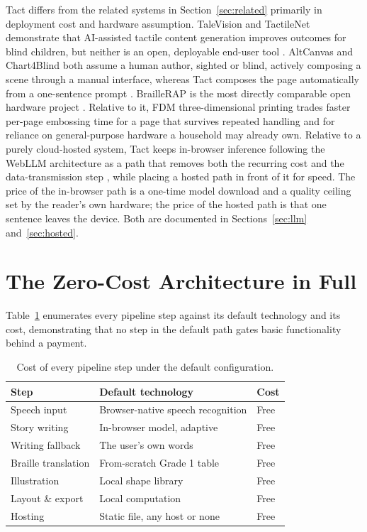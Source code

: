 \documentclass[conference]{IEEEtran}
\begin{document}
Tact differs from the related systems in Section~\ref{sec:related} primarily in deployment cost and hardware assumption. TaleVision and TactileNet demonstrate that AI-assisted tactile content generation improves outcomes for blind children, but neither is an open, deployable end-user tool \cite{talevision,tactilenet}. AltCanvas and Chart4Blind both assume a human author, sighted or blind, actively composing a scene through a manual interface, whereas Tact composes the page automatically from a one-sentence prompt \cite{altcanvas,chart4blind}. BrailleRAP is the most directly comparable open hardware project \cite{braillerap}. Relative to it, FDM three-dimensional printing trades faster per-page embossing time for a page that survives repeated handling and for reliance on general-purpose hardware a household may already own. Relative to a purely cloud-hosted system, Tact keeps in-browser inference following the WebLLM architecture as a path that removes both the recurring cost and the data-transmission step \cite{webllm}, while placing a hosted path in front of it for speed. The price of the in-browser path is a one-time model download and a quality ceiling set by the reader's own hardware; the price of the hosted path is that one sentence leaves the device. Both are documented in Sections~\ref{sec:llm} and~\ref{sec:hosted}.

\section{The Zero-Cost Architecture in Full}\label{sec:zerocost}

Table~\ref{tab:zerocost} enumerates every pipeline step against its default technology and its cost, demonstrating that no step in the default path gates basic functionality behind a payment.

\begin{table}[t]
\caption{Cost of every pipeline step under the default configuration.}
\label{tab:zerocost}
\centering
\begin{tabular}{p{2.3cm}p{2.9cm}p{0.9cm}}
\toprule
Step & Default technology & Cost \\
\midrule
Speech input & Browser-native speech recognition & Free \\
Story writing & In-browser model, adaptive & Free \\
Writing fallback & The user's own words & Free \\
Braille translation & From-scratch Grade 1 table & Free \\
Illustration & Local shape library & Free \\
Layout \& export & Local computation & Free \\
Hosting & Static file, any host or none & Free \\
\bottomrule
\end{tabular}
\end{table}
\end{document}
